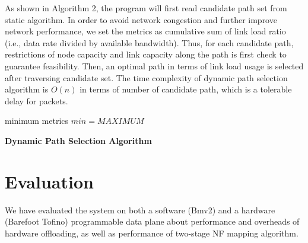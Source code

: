 \documentclass[10pt, conference, letterpaper]{IEEEtran}
\begin{document}
 As shown in Algorithm 2, the program will first read candidate path set from static algorithm. In order to avoid network congestion and further improve network performance, we set the metrics as cumulative sum of link load ratio (i.e., data rate divided by available bandwidth). 
 Thus, for each candidate path, restrictions of node capacity and link capacity along the path is first check to guarantee feasibility. Then, an optimal path in terms of link load usage is selected after traversing candidate set.
 The time complexity of dynamic path selection algorithm is $O(n)$ in terms of number of candidate path, which is a tolerable delay for packets.


\begin{algorithm}[h]

\nl minimum metrics $min = MAXIMUM$\;

\caption{{\bf Dynamic Path Selection Algorithm} \label{Dynamic}}
\end{algorithm}



\section{Evaluation}
We have evaluated the system on both a software (Bmv2) and a hardware (Barefoot Tofino) programmable data plane about performance and overheads of hardware offloading, as well as performance of two-stage NF mapping algorithm. 
\end{document}
